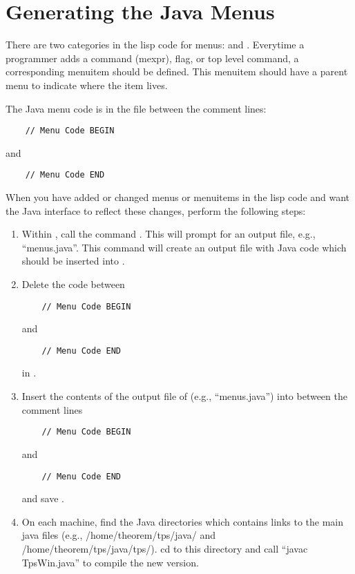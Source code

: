 \section{Generating the Java Menus}

There are two categories in the \TPS lisp code for menus:
 and .  Everytime
a programmer adds a command (mexpr), flag, or top level
command, a corresponding menuitem should be defined.
This menuitem should have a parent menu to indicate where
the item lives.

The Java menu code is in the file 
between the comment lines:
\begin{verbatim}
    // Menu Code BEGIN
\end{verbatim}
and
\begin{verbatim}
    // Menu Code END
\end{verbatim}
When you have added or changed menus or menuitems in
the lisp code and want the Java interface to reflect these
changes, perform the following steps:
\begin{enumerate}
\item Within \TPS, call the command .
This will prompt for an output file, e.g., ``menus.java''.
This command will create an output file with Java code which should
be inserted into .
\item Delete the code between
\begin{verbatim}
    // Menu Code BEGIN
\end{verbatim}
and
\begin{verbatim}
    // Menu Code END
\end{verbatim}
in .
\item Insert the contents of the output file of 
(e.g., ``menus.java'') into  between the comment lines
\begin{verbatim}
    // Menu Code BEGIN
\end{verbatim}
and
\begin{verbatim}
    // Menu Code END
\end{verbatim}
and save .
\item On each machine, find the Java directories which contains links
to the main java files (e.g., /home/theorem/tps/java/ and /home/theorem/tps/java/tps/).
cd to this
directory and call ``javac TpsWin.java'' to compile the new version.
\end{enumerate}

